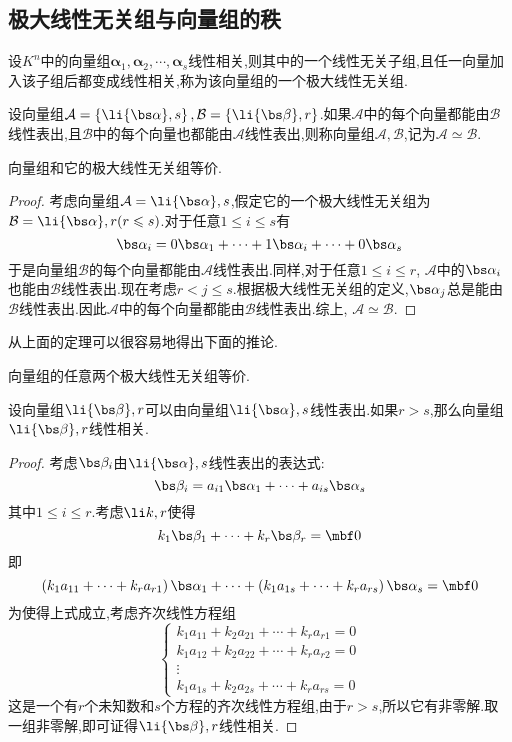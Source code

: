 \documentclass{ctexart}
\begin{document}
\subsection{极大线性无关组与向量组的秩}
\begin{definition}[极大线性无关组]
    设$K^n$中的向量组$\boldsymbol{\alpha}_1,\boldsymbol{\alpha}_2,\cdots,\boldsymbol{\alpha}_s$线性相关,则其中的一个线性无关子组,且任一向量加入该子组后都变成线性相关,称为该向量组的一个极大线性无关组.
\end{definition}
\begin{definition}[等价的向量组]
    设向量组$\mathcal{A}=\left\{\li{\bs\alpha},s\right\},\mathcal{B}=\left\{\li{\bs\beta},r\right\}$.如果$\mathcal{A}$中的每个向量都能由$\mathcal{B}$线性表出,且$\mathcal{B}$中的每个向量也都能由$\mathcal{A}$线性表出,则称向量组$\mathcal{A},\mathcal{B}$,记为$\mathcal{A}\simeq\mathcal{B}$.
\end{definition}
\begin{theorem}
    向量组和它的极大线性无关组等价.
\end{theorem}
\begin{proof}
    考虑向量组$\mathcal{A}=\li{\bs\alpha},s$,假定它的一个极大线性无关组为$\mathcal{B}=\li{\bs\alpha},r(r\leqslant s)$.对于任意$1\leqslant i\leqslant s$有
    \[\bs\alpha_i=0\bs\alpha_1+\cdots+1\bs\alpha_i+\cdots+0\bs\alpha_s\]
    于是向量组$\mathcal{B}$的每个向量都能由$\mathcal{A}$线性表出.同样,对于任意$1\leqslant i\leqslant r$, $\mathcal{A}$中的$\bs\alpha_i$也能由$\mathcal{B}$线性表出.现在考虑$r<j\leqslant s$.根据极大线性无关组的定义,$\bs\alpha_j$总是能由$\mathcal{B}$线性表出.因此$\mathcal{A}$中的每个向量都能由$\mathcal{B}$线性表出.综上, $\mathcal{A}\simeq\mathcal{B}$.
\end{proof}
从上面的定理可以很容易地得出下面的推论.
\begin{lemma}
    向量组的任意两个极大线性无关组等价.
\end{lemma}
\begin{theorem}
    设向量组$\li{\bs\beta},r$可以由向量组$\li{\bs\alpha},s$线性表出.如果$r>s$,那么向量组$\li{\bs\beta},r$线性相关.
\end{theorem}
\begin{proof}
    考虑$\bs\beta_i$由$\li{\bs\alpha},s$线性表出的表达式:
    \[\bs\beta_i=a_{i1}\bs\alpha_1+\cdots+a_{is}\bs\alpha_s\]
    其中$1\leqslant i\leqslant r$.考虑$\li k,r$使得
    \[k_1\bs\beta_1+\cdots+k_r\bs\beta_r=\mbf0\]
    即
    \[\left(k_1a_{11}+\cdots+k_ra_{r1}\right)\bs\alpha_1+\cdots+\left(k_1a_{1s}+\cdots+k_ra_{rs}\right)\bs\alpha_s=\mbf0\]
    为使得上式成立,考虑齐次线性方程组
    \[\left\{\begin{array}{c}
        k_1a_{11}+k_2a_{21}+\cdots+k_ra_{r1}=0\\
        k_1a_{12}+k_2a_{22}+\cdots+k_ra_{r2}=0\\
        \vdots\\
        k_1a_{1s}+k_2a_{2s}+\cdots+k_ra_{rs}=0
    \end{array}\right.\]
    这是一个有$r$个未知数和$s$个方程的齐次线性方程组,由于$r>s$,所以它有非零解.取一组非零解,即可证得$\li{\bs\beta},r$线性相关.
\end{proof}
\end{document}
